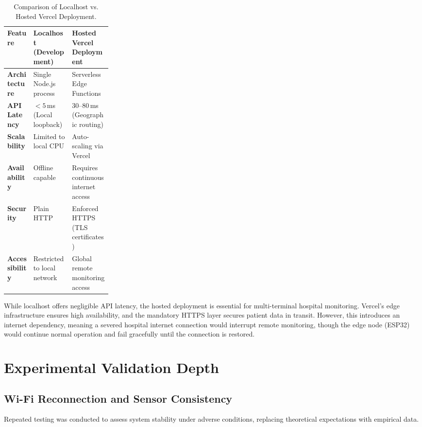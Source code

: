 \begin{table}[H]
	\centering
	\caption{Comparison of Localhost vs. Hosted Vercel Deployment.}
	\label{tab:deployment_comparison}
	\begin{tabularx}{\linewidth}{>{\raggedright\arraybackslash}p{0.25\linewidth} XX}
		\toprule
		\textbf{Feature} & \textbf{Localhost (Development)} & \textbf{Hosted Vercel Deployment} \\
		\midrule
		\textbf{Architecture} & Single Node.js process & Serverless Edge Functions \\
		\textbf{API Latency} & $< 5$\,ms (Local loopback) & 30--80\,ms (Geographic routing) \\
		\textbf{Scalability} & Limited to local CPU & Auto-scaling via Vercel \\
		\textbf{Availability} & Offline capable & Requires continuous internet access \\
		\textbf{Security} & Plain HTTP & Enforced HTTPS (TLS certificates) \\
		\textbf{Accessibility} & Restricted to local network & Global remote monitoring access \\
		\bottomrule
	\end{tabularx}
\end{table}

While localhost offers negligible API latency, the hosted deployment is essential for multi-terminal hospital monitoring. Vercel's edge infrastructure ensures high availability, and the mandatory HTTPS layer secures patient data in transit. However, this introduces an internet dependency, meaning a severed hospital internet connection would interrupt remote monitoring, though the edge node (ESP32) would continue normal operation and fail gracefully until the connection is restored.

\section{Experimental Validation Depth}

\subsection{Wi-Fi Reconnection and Sensor Consistency}
Repeated testing was conducted to assess system stability under adverse conditions, replacing theoretical expectations with empirical data.

